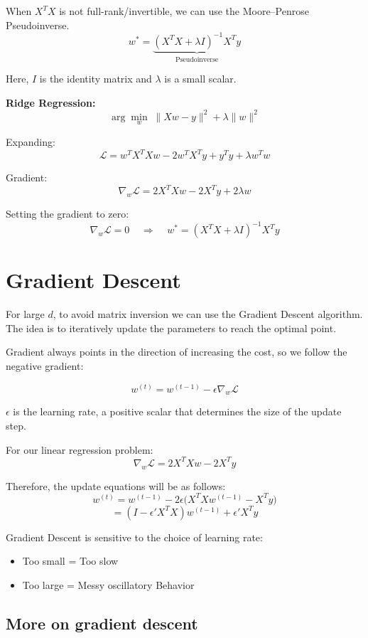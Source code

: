 \documentclass[11pt]{article}
\begin{document}
When $X^T X$ is not full-rank/invertible, we can use the Moore--Penrose Pseudoinverse.
\[
	w^* = \underbrace{(X^T X + \lambda I)^{-1} X^T y}_{\text{Pseudoinverse}}
\]

Here, $I$ is the identity matrix and $\lambda$ is a small scalar.

\bigskip

\textbf{Ridge Regression:}
\[
	\arg\min_w \; \|Xw - y\|^2 + \lambda \|w\|^2
\]

Expanding:
\[
	\mathcal{L} = w^T X^T X w - 2 w^T X^T y + y^T y + \lambda w^T w
\]

Gradient:
\[
	\nabla_w \mathcal{L} = 2X^T X w - 2X^T y + 2\lambda w
\]

Setting the gradient to zero:
\[
	\nabla_w \mathcal{L} = 0 \;\;\;\;\Rightarrow\;\;\;\; w^* = (X^T X + \lambda I)^{-1} X^T y
\]

\section*{Gradient Descent}


For large $d$, to avoid matrix inversion we can use the Gradient Descent algorithm.
The idea is to iteratively update the parameters to reach the optimal point.

\medskip

\noindent Gradient always points in the direction of increasing the cost, so we follow the negative gradient:

\[
	w^{(t)} = w^{(t-1)} - \epsilon \nabla_w \mathcal{L}
\]

$\epsilon$ is the learning rate, a positive scalar that determines the size of the update step.

\pagebreak

For our linear regression problem:
\[
	\nabla_w \mathcal{L} = 2X^T X w - 2X^T y
\]

Therefore, the update equations will be as follows:
\[
	w^{(t)} = w^{(t-1)} - 2\epsilon \big(X^T X w^{(t-1)} - X^T y\big)
\]
\[
	= (I - \epsilon' X^T X) w^{(t-1)} + \epsilon' X^T y
\]

Gradient Descent is sensitive to the choice of learning rate:
\begin{itemize}
	\item Too small = Too slow
	\item Too large = Messy oscillatory Behavior
\end{itemize}


\subsection*{More on gradient descent}
\end{document}
